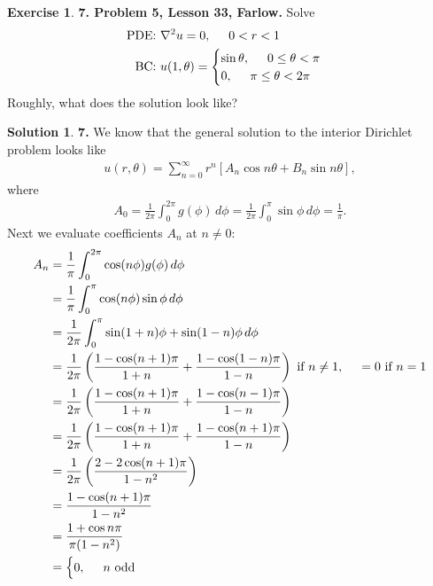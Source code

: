 \documentclass{article}
\theoremstyle{definition}
\newtheorem*{exer*}{Exercise}
\newtheorem*{sln*}{Solution}
\newcommand{\f}[2]{\frac{#1}{#2}}
\newcommand{\lp}{\left(}
\newcommand{\rp}{\right)}
\newcommand{\lb}{\left[}
\newcommand{\rb}{\right]}
\begin{document}
\begin{exer*}\textbf{7. Problem 5, Lesson 33, Farlow.} Solve 
	\begin{align*}
	\text{PDE: } & \laplacian u = 0, \hspace{0.5cm} 0 < r < 1\\
	\text{BC: } & u(1,\theta) = \begin{cases}
	\sin\theta, \hspace{0.5cm} 0 \leq \theta < \pi\\
	0, \hspace{0.5cm} \pi \leq \theta < 2\pi
	\end{cases}
	\end{align*}
	Roughly, what does the solution look like? 
	
	\begin{sln*}\textbf{7.} We know that the general solution to the interior Dirichlet problem looks like
		\begin{align*}
		u(r,\theta) = \sum^\infty_{n=0}r^n \lb A_n\cos n\theta + B_n \sin n\theta\rb,
		\end{align*}
		where
		\begin{align*}
		A_0 = \f{1}{2\pi}\int^{2\pi}_0 g(\phi)\,d\phi = \f{1}{2\pi}\int^{\pi}_0 \sin\phi\,d\phi = \f{1}{\pi}.
		\end{align*}
		Next we evaluate coefficients $A_n$ at $n\neq 0$:
		\begin{align*}
		A_n &= \f{1}{\pi}\int^{2\pi}_0 \cos(n\phi)g(\phi)\,d\phi \\
		&= \f{1}{\pi}\int^{\pi}_0 \cos(n\phi)\sin\phi\,d\phi \\
		&= \f{1}{2\pi}\int^{\pi}_0 \sin(1+n)\phi + \sin(1-n)\phi\,d\phi\\
		&= \frac{1}{2\pi}\lp\f{1 - \cos(n+1)\pi}{1+n} + \f{1 - \cos(1-n)\pi}{1-n}\rp \text{ if }n\neq 1, \hspace{0.5cm} = 0 \text{ if } n = 1\\
		&= \frac{1}{2\pi}\lp\f{1 - \cos(n+1)\pi}{1+n} + \f{1 - \cos(n-1)\pi}{1-n}\rp\\
		&= \frac{1}{2\pi}\lp\f{1 - \cos(n+1)\pi}{1+n} + \f{1 - \cos(n+1)\pi}{1-n}\rp\\
		&= \f{1}{2\pi}\lp\f{2 - 2\cos(n+1)\pi}{1-n^2}\rp\\
		&= \f{1 - \cos(n+1)\pi}{1 - n^2}\\
		&= \f{1 + \cos n\pi}{\pi(1-n^2)}\\
		&= \begin{cases}
		0, \hspace{0.5cm} n \text{ odd}\\

\end{cases}
\end{align*}
\end{sln*}
\end{exer*}
\end{document}
